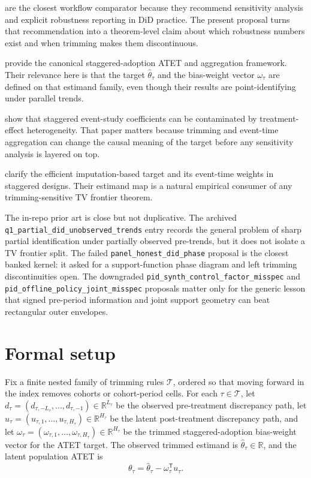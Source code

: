 \documentclass[11pt]{article}
\newcommand{\transpose}{\mathsf{T}}
\newcommand{\R}{\mathbb{R}}
\theoremstyle{definition}
\theoremstyle{plain}
\theoremstyle{remark}
\begin{document}
\citet{RothSantAnnaBilinskiPoe2023TrendingDiD} are the closest workflow comparator because they recommend sensitivity analysis and explicit robustness reporting in DiD practice. The present proposal turns that recommendation into a theorem-level claim about which robustness numbers exist and when trimming makes them discontinuous.

\citet{CallawaySantAnna2021MultiplePeriods} provide the canonical staggered-adoption ATET and aggregation framework. Their relevance here is that the target \(\hat\theta_\tau\) and the bias-weight vector \(\omega_\tau\) are defined on that estimand family, even though their results are point-identifying under parallel trends.

\citet{SunAbraham2021DynamicEffects} show that staggered event-study coefficients can be contaminated by treatment-effect heterogeneity. That paper matters because trimming and event-time aggregation can change the causal meaning of the target before any sensitivity analysis is layered on top.

\citet{BorusyakJaravelSpiess2024EventStudies} clarify the efficient imputation-based target and its event-time weights in staggered designs. Their estimand map is a natural empirical consumer of any trimming-sensitive TV frontier theorem.

The in-repo prior art is close but not duplicative. The archived \texttt{q1\_partial\_did\_unobserved\_trends} entry records the general problem of sharp partial identification under partially observed pre-trends, but it does not isolate a TV frontier split. The failed \texttt{panel\_honest\_did\_phase} proposal is the closest banked kernel: it asked for a support-function phase diagram and left trimming discontinuities open. The downgraded \texttt{pid\_synth\_control\_factor\_misspec} and \texttt{pid\_offline\_policy\_joint\_misspec} proposals matter only for the generic lesson that signed pre-period information and joint support geometry can beat rectangular outer envelopes.

\section{Formal setup}
Fix a finite nested family of trimming rules \(\mathcal T\), ordered so that moving forward in the index removes cohorts or cohort-period cells. For each \(\tau\in\mathcal T\), let \(d_\tau=(d_{\tau,-L_\tau},\ldots,d_{\tau,-1})\in\R^{L_\tau}\) be the observed pre-treatment discrepancy path, let \(u_\tau=(u_{\tau,1},\ldots,u_{\tau,H_\tau})\in\R^{H_\tau}\) be the latent post-treatment discrepancy path, and let \(\omega_\tau=(\omega_{\tau,1},\ldots,\omega_{\tau,H_\tau})\in\R^{H_\tau}\) be the trimmed staggered-adoption bias-weight vector for the ATET target. The observed trimmed estimand is \(\hat\theta_\tau\in\R\), and the latent population ATET is
\[
  \theta_\tau = \hat\theta_\tau - \omega_\tau^\transpose u_\tau .
\]
\end{document}
